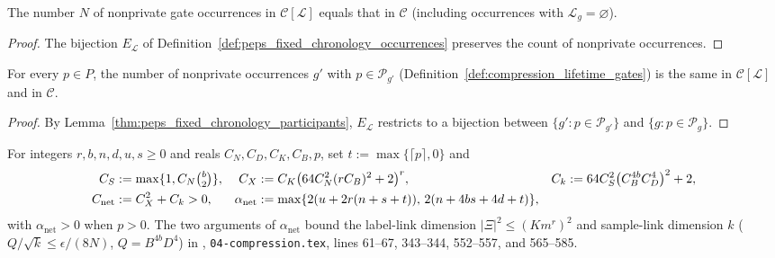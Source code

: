 \begin{lemma}
    \label{thm:peps_fixed_chronology_gate_count}
    \leanok
    The number $N$ of nonprivate gate occurrences in $\mathcal C[\mathcal L]$ equals that in $\mathcal C$ (including occurrences with $\mathcal L_g=\varnothing$).
\end{lemma}
\begin{proof}
    \leanok
    The bijection $E_{\mathcal L}$ of Definition~\ref{def:peps_fixed_chronology_occurrences} preserves the count of nonprivate occurrences.
\end{proof}

\begin{lemma}
    \label{thm:peps_fixed_chronology_lifetime}
    \leanok
    For every $p\in P$, the number of nonprivate occurrences $g'$ with $p\in\mathcal P_{g'}$ (Definition~\ref{def:compression_lifetime_gates}) is the same in $\mathcal C[\mathcal L]$ and in $\mathcal C$.
\end{lemma}
\begin{proof}
    \leanok
    By Lemma~\ref{thm:peps_fixed_chronology_participants}, $E_{\mathcal L}$ restricts to a bijection between $\{g':p\in\mathcal P_{g'}\}$ and $\{g:p\in\mathcal P_g\}$.
\end{proof}

\begin{definition}
    \label{def:peps_sampled_network_constants}
    \leanok
    For integers $r,b,n,d,u,s\ge0$ and reals $C_N,C_D,C_K,C_B,p$, set $t:=\max\{\lceil p\rceil,0\}$ and
    \begin{align}
        C_S                   & := \max\{1,C_N\tbinom b2\},                                                          &
        C_X                   & := C_K\bigl(64C_N^2(rC_B)^2+2\bigr)^r,                                               &
        C_k                   & := 64C_S^2\bigl(C_B^{4b}C_D^4\bigr)^2+2, \notag                                        \\
        C_{\mathrm{net}}      & := C_X^2+C_k > 0,                                                                    &
        \alpha_{\mathrm{net}} & := \max\{2(u+2r(n+s+t)),\,2(n+4bs+4d+t)\}, \label{eq:peps_sampled_network_constants}
    \end{align}
    with $\alpha_{\mathrm{net}}>0$ when $p>0$. The two arguments of $\alpha_{\mathrm{net}}$ bound the label-link dimension $|\Xi|^2\le(Km^r)^2$ and sample-link dimension $k$ ($Q/\sqrt k\le\epsilon/(8N)$, $Q=B^{4b}D^4$) in \cite{OpenAI2026PolynomialPEPS}, \texttt{04-compression.tex}, lines 61--67, 343--344, 552--557, and 565--585.
\end{definition}


